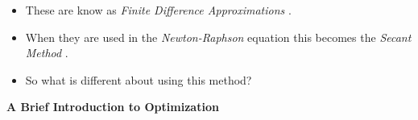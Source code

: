 \documentclass[11pt]{article}
\begin{document}
\begin{itemize}
\begin{itemize}
\newpage
	\item \LARGE{These are know as {\it Finite Difference Approximations} .}\\
	\item \LARGE{When they are used in the {\it Newton-Raphson} equation this becomes the {\it Secant Method} .}\vspace{25mm}\\
	
	\item \LARGE{So what is different about using this method? }\\
		
\end{itemize}

		\newpage

\end{itemize}
\newpage 

\textbf{ \LARGE A Brief Introduction to Optimization } \\
\end{document}
